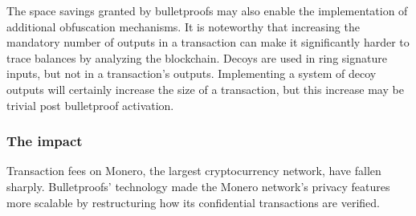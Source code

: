 The space savings granted by bulletproofs may also enable the implementation of additional obfuscation mechanisms. It is noteworthy that increasing the mandatory number of outputs in a transaction can make it significantly harder to trace balances by analyzing the blockchain. Decoys are used in ring signature inputs, but not in a transaction’s outputs. Implementing a system of decoy outputs will certainly increase the size of a transaction, but this increase may be trivial post bulletproof activation.

\subsubsection{The impact}
Transaction fees on Monero, the  largest cryptocurrency network, have fallen sharply. Bulletproofs' technology made the Monero network’s privacy features more scalable by restructuring how its confidential transactions are verified.

